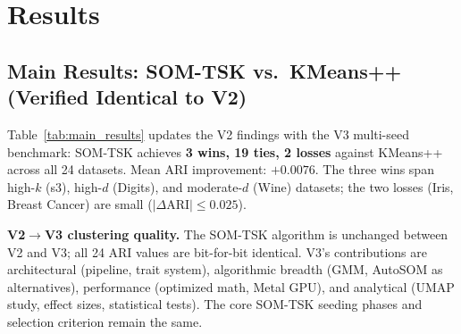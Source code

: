 \documentclass[journal]{IEEEtran}
\begin{document}
\section{Results}
\label{sec:results}

\subsection{Main Results: SOM-TSK vs.\ KMeans++ (Verified Identical to V2)}

Table~\ref{tab:main_results} updates the V2 findings with the V3 multi-seed benchmark: SOM-TSK achieves \textbf{3 wins, 19 ties, 2 losses} against KMeans++ across all 24 datasets. Mean ARI improvement: $+0.0076$. The three wins span high-$k$ (s3), high-$d$ (Digits), and moderate-$d$ (Wine) datasets; the two losses (Iris, Breast Cancer) are small ($|\Delta\text{ARI}| \le 0.025$).

\textbf{V2$\to$V3 clustering quality.} The SOM-TSK algorithm is unchanged between V2 and V3; all 24 ARI values are bit-for-bit identical. V3's contributions are architectural (pipeline, trait system), algorithmic breadth (GMM, AutoSOM as alternatives), performance (optimized math, Metal GPU), and analytical (UMAP study, effect sizes, statistical tests). The core SOM-TSK seeding phases and selection criterion remain the same.
\end{document}

